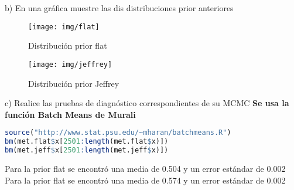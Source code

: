 \documentclass[11pt]{article}
\begin{document}
\noindent b) En una gráfica muestre las dis distribuciones prior anteriores
\begin{figure} [H]
	\texttt{[image: img/flat]}
	\caption[]{Distribución prior flat}
\label{fig:fig1}
\end{figure}

\begin{figure} [H]
	\texttt{[image: img/jeffrey]}
	\caption[]{Distribución prior Jeffrey}
\label{fig:fig1}
\end{figure}

\noindent c) Realice las pruebas de diagnóstico correspondientes de su MCMC
\noindent \textbf{ Se usa la función Batch Means de Murali }

\begin{lstlisting}[language=R]
source("http://www.stat.psu.edu/~mharan/batchmeans.R")
bm(met.flat$x[2501:length(met.flat$x)])
bm(met.jeff$x[2501:length(met.jeff$x)])
\end{lstlisting}

Para la prior flat se encontró una media de 0.504 y un error estándar de 0.002 \\
Para la prior flat se encontró una media de 0.574 y un error estándar de 0.002

\noindent
\end{document}
